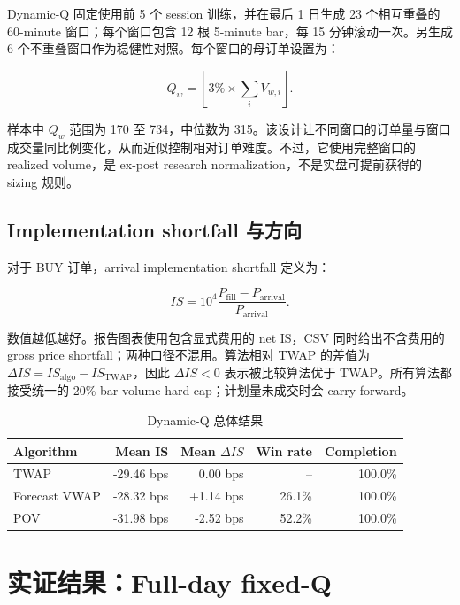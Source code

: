 \documentclass[11pt,a4paper,fontset=fandol]{ctexart}
\begin{document}
Dynamic-Q 固定使用前 5 个 session 训练，并在最后 1 日生成 23 个相互重叠的 60-minute 窗口；每个窗口包含 12 根 5-minute bar，每 15 分钟滚动一次。另生成 6 个不重叠窗口作为稳健性对照。每个窗口的母订单设置为：

\begin{equation}
Q_w=\left\lfloor 3\%\times\sum_i V_{w,i}\right\rfloor.
\end{equation}

样本中 $Q_w$ 范围为 170 至 734，中位数为 315。该设计让不同窗口的订单量与窗口成交量同比例变化，从而近似控制相对订单难度。不过，它使用完整窗口的 realized volume，是 ex-post research normalization，不是实盘可提前获得的 sizing 规则。

\subsection{Implementation shortfall 与方向}

对于 BUY 订单，arrival implementation shortfall 定义为：

\begin{equation}
IS=10^4\frac{P_{\mathrm{fill}}-P_{\mathrm{arrival}}}
{P_{\mathrm{arrival}}}.
\end{equation}

数值越低越好。报告图表使用包含显式费用的 net IS，CSV 同时给出不含费用的 gross price shortfall；两种口径不混用。算法相对 TWAP 的差值为 $\Delta IS=IS_{\mathrm{algo}}-IS_{\mathrm{TWAP}}$，因此 $\Delta IS<0$ 表示被比较算法优于 TWAP。所有算法都接受统一的 20\% bar-volume hard cap；计划量未成交时会 carry forward。

\begin{table}[H]
\centering
\small
\caption{Dynamic-Q 总体结果}
\begin{tabular}{lrrrr}
\toprule
\textbf{Algorithm} & \textbf{Mean IS} & \textbf{Mean $\Delta IS$} & \textbf{Win rate} & \textbf{Completion} \\
\midrule
TWAP & -29.46 bps & 0.00 bps & -- & 100.0\% \\
Forecast VWAP & -28.32 bps & +1.14 bps & 26.1\% & 100.0\% \\
POV & -31.98 bps & -2.52 bps & 52.2\% & 100.0\% \\
\bottomrule
\end{tabular}
\end{table}

\clearpage
\section{实证结果：Full-day fixed-Q}
\end{document}
